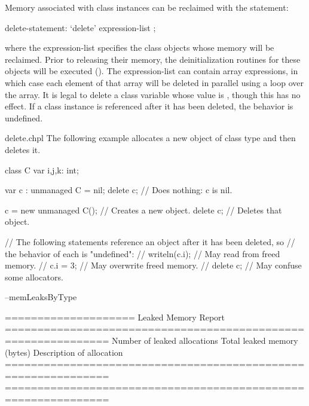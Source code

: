 Memory associated with  class instances can be reclaimed
with the  statement:

\begin{syntax}
delete-statement:
  `delete' expression-list ;
\end{syntax}

where the expression-list specifies the class objects whose memory
will be reclaimed.  Prior to releasing their memory, the
deinitialization routines for these objects will be executed
().  The expression-list can contain array
expressions, in which case each element of that array will be deleted
in parallel using a  loop over the array.  It is legal to
delete a class variable whose value is , though this has no
effect.  If a class instance is referenced after it has been deleted,
the behavior is undefined.

\begin{chapelexample}{delete.chpl}
The following example allocates a new object  of class type 
and then deletes it.
\begin{chapelpre}
class C {
  var i,j,k: int;
}
\end{chapelpre}
\begin{chapel}
var c : unmanaged C = nil;
delete c;              // Does nothing: c is nil.

c = new unmanaged C(); // Creates a new object.
delete c;              // Deletes that object.

// The following statements reference an object after it has been deleted, so
// the behavior of each is "undefined":
// writeln(c.i); // May read from freed memory.
// c.i = 3;      // May overwrite freed memory.
// delete c;     // May confuse some allocators.
\end{chapel}
\begin{chapelpost}
\end{chapelpost}
\begin{chapelexecopts}
--memLeaksByType
\end{chapelexecopts}
\begin{chapeloutput}

====================
Leaked Memory Report
==============================================================
Number of leaked allocations
           Total leaked memory (bytes)
                      Description of allocation
==============================================================
==============================================================
\end{chapeloutput}
\end{chapelexample}

